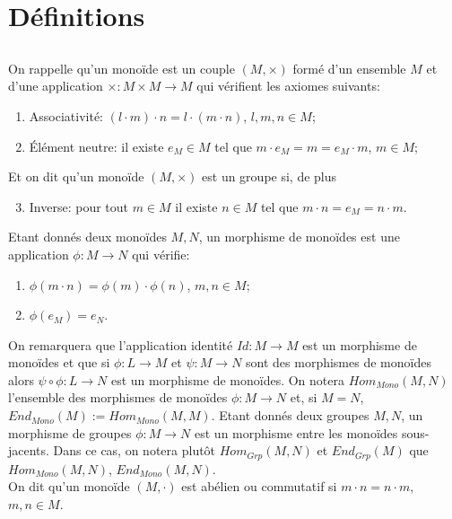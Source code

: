 \documentclass[a4paper, oneside, 12pt]{book}
\theoremstyle{definition} %
\begin{document}
\section{Définitions}
\subsection{}On rappelle qu'un monoïde  est un couple $(M,\times)$ formé d'un ensemble $M$ et d'une application $\times:M\times M\rightarrow M$ qui vérifient les axiomes suivants:
\begin{enumerate}
\item Associativité: $(l\cdot m)\cdot n=l\cdot (m\cdot n)$, $l,m,n\in M$;
\item Élément neutre: il existe $e_M\in M$ tel que $m\cdot e_M=m=e_M\cdot m$, $m\in M$;
\end{enumerate}
 Et on dit qu'un monoïde    $(M,\times)$ est un groupe si, de plus
\begin{enumerate}
\setcounter{enumi}{2}
\item Inverse: pour tout $m\in M$ il existe $n\in M$ tel  que $m\cdot n=e_M=n\cdot m$.\\
\end{enumerate}
 Etant donnés deux monoïdes $M,N$, un morphisme de monoïdes est une application $\phi:M\rightarrow N$   qui vérifie:
\begin{enumerate}
\item $\phi(m\cdot n)=\phi(m)\cdot\phi(n)$, $m,n\in M$;
\item $\phi(e_M )=e_N$.
\end{enumerate}
On remarquera que l'application identité $Id:M\rightarrow M$ est un morphisme de monoïdes et que si $\phi:L\rightarrow M$ et $\psi:M\rightarrow N$ sont des morphismes de monoïdes alors $\psi\circ \phi:L\rightarrow N$ est un morphisme de monoïdes. On notera $Hom_{Mono}(M,N)$ l'ensemble des morphismes de monoïdes $\phi:M\rightarrow N$ et, si $M=N$, $End_{Mono}(M):=Hom_{Mono}(M,M)$.  Etant donnés deux groupes $M,N$, un morphisme de groupes $\phi:M\rightarrow N$ est un morphisme entre les monoïdes sous-jacents. Dans ce cas, on notera plutôt $Hom_{Grp}(M,N)$ et $End_{Grp}(M)$ que $Hom_{Mono}(M,N)$, $End_{Mono}(M,N)$. \\

 On dit qu'un monoïde $(M,\cdot)$ est abélien ou commutatif si $m\cdot n=n\cdot m$, $m,n\in M$.
\end{document}
